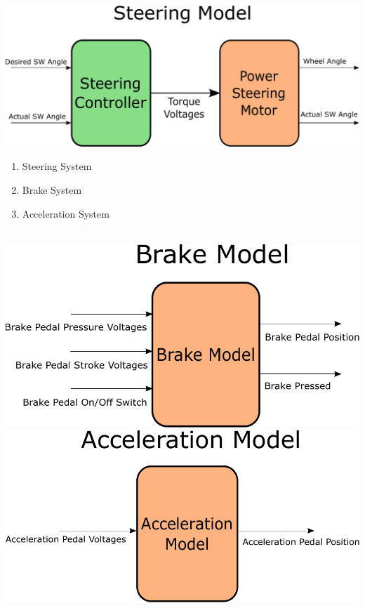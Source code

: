 \documentclass{beamer}
\begin{document}
\begin{frame}
\centering
\includegraphics[width=.45\linewidth]{figs/inkscape/steeringModelArchitecture}\quad%
\begin{minipage}[b][0.4\textheight][c]{.45\linewidth} \begin{enumerate} \item Steering System \item Brake System \item Acceleration System \end{enumerate} \end{minipage}\\[1em]
\includegraphics[width=.45\linewidth]{figs/inkscape/brakeModelArchitecture}\quad%
\includegraphics[width=.45\linewidth]{figs/inkscape/accelerationModelArchitecture}
\end{frame}
\end{document}
